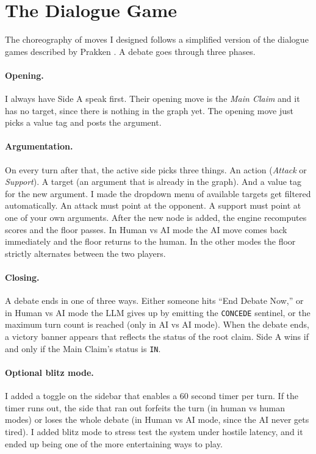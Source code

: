 \section{The Dialogue Game}
\label{sec:dialogue_game}
The choreography of moves I designed follows a simplified version of the dialogue games described by Prakken \cite{prakken2005coherence}. A debate goes through three phases.

\paragraph{Opening.} I always have Side A speak first. Their opening move is the \emph{Main Claim} and it has no target, since there is nothing in the graph yet. The opening move just picks a value tag and posts the argument.

\paragraph{Argumentation.} On every turn after that, the active side picks three things. An action (\emph{Attack} or \emph{Support}). A target (an argument that is already in the graph). And a value tag for the new argument. I made the dropdown menu of available targets get filtered automatically. An attack must point at the opponent. A support must point at one of your own arguments. After the new node is added, the engine recomputes scores and the floor passes. In Human vs AI mode the AI move comes back immediately and the floor returns to the human. In the other modes the floor strictly alternates between the two players.

\paragraph{Closing.} A debate ends in one of three ways. Either someone hits ``End Debate Now,'' or in Human vs AI mode the LLM gives up by emitting the \texttt{CONCEDE} sentinel, or the maximum turn count is reached (only in AI vs AI mode). When the debate ends, a victory banner appears that reflects the status of the root claim. Side A wins if and only if the Main Claim's status is \texttt{IN}.

\paragraph{Optional blitz mode.} I added a toggle on the sidebar that enables a 60 second timer per turn. If the timer runs out, the side that ran out forfeits the turn (in human vs human modes) or loses the whole debate (in Human vs AI mode, since the AI never gets tired). I added blitz mode to stress test the system under hostile latency, and it ended up being one of the more entertaining ways to play.


